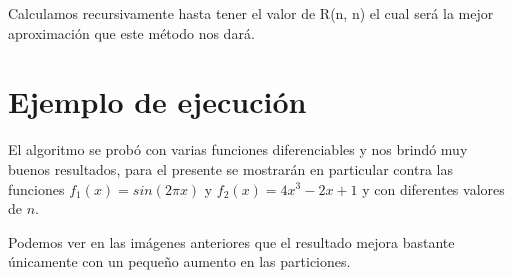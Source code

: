 \documentclass[12pt]{article}
\begin{document}
Calculamos recursivamente hasta tener el valor de R(n, n) el cual será la mejor aproximación que este método nos dará.

\section{Ejemplo de ejecución}
El algoritmo se probó con varias funciones diferenciables y nos brindó muy buenos resultados, para el presente se mostrarán en particular contra las funciones $f_1(x) = sin(2 \pi x)$ y $f_2(x) = 4x^3 - 2x + 1$ y con diferentes valores de $n$.

\begin{figure}[H]
	\centering
	\hfill
\end{figure}

\begin{figure}[H]
	\centering
	\hfill
\end{figure}

\begin{figure}[H]
	\centering
	\hfill
\end{figure}

Podemos ver en las imágenes anteriores que el resultado mejora bastante únicamente con un pequeño aumento en las particiones.

\begin{figure}[H]
	\centering
	\hfill
\end{figure}
\end{document}
